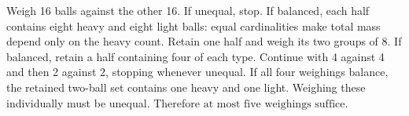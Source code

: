 Weigh 16 balls against the other 16. If unequal, stop. If balanced, each half contains eight heavy and eight light balls: equal cardinalities make total mass depend only on the heavy count. Retain one half and weigh its two groups of 8. If balanced, retain a half containing four of each type. Continue with 4 against 4 and then 2 against 2, stopping whenever unequal. If all four weighings balance, the retained two-ball set contains one heavy and one light. Weighing these individually must be unequal. Therefore $\boxed{\text{at most five weighings suffice}}$.
